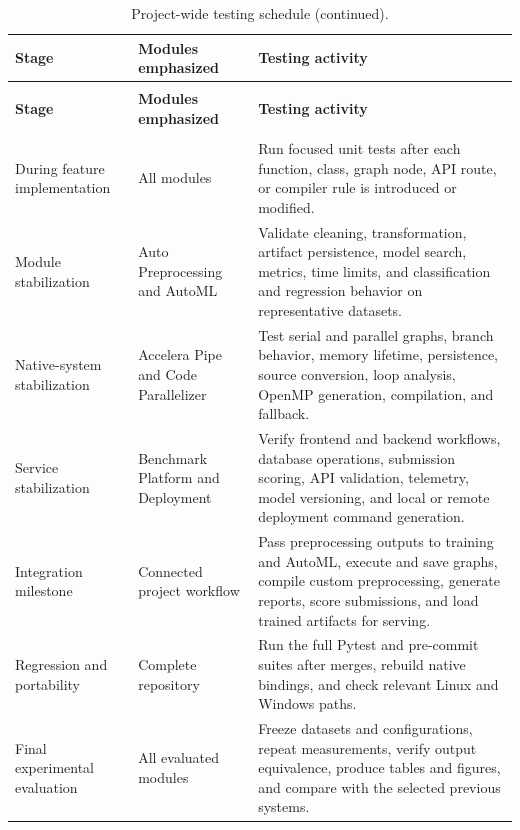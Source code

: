 \documentclass[12pt,a4paper]{report}
\newcommand{\acceleraTableStyle}{%
\small
\renewcommand{\arraystretch}{1.15}
\setlength{\tabcolsep}{4pt}%
}
\begin{document}
\acceleraTableStyle
\begin{longtable}{>{\raggedright\arraybackslash}p{}
  >{\raggedright\arraybackslash}p{}
  >{\raggedright\arraybackslash}p{}}
\caption{Project-wide testing schedule.}
\label{tab:project-testing-schedule}\\
\toprule
\textbf{Stage} & \textbf{Modules emphasized} & \textbf{Testing activity} \\
\midrule
\endfirsthead
\caption[]{Project-wide testing schedule (continued).}\\
\toprule
\textbf{Stage} & \textbf{Modules emphasized} & \textbf{Testing activity} \\
\midrule
\endhead
\midrule
\multicolumn{3}{r}{\small Continued on the next page}\\
\endfoot
\bottomrule
\endlastfoot
During feature implementation & All modules & Run focused unit tests after each
function, class, graph node, API route, or compiler rule is introduced or
modified. \\
\midrule
Module stabilization & Auto Preprocessing and AutoML & Validate cleaning,
transformation, artifact persistence, model search, metrics, time limits, and
classification and regression behavior on representative datasets. \\
\midrule
Native-system stabilization & Accelera Pipe and Code Parallelizer & Test serial
and parallel graphs, branch behavior, memory lifetime, persistence, source
conversion, loop analysis, OpenMP generation, compilation, and fallback. \\
\midrule
Service stabilization & Benchmark Platform and Deployment & Verify frontend and
backend workflows, database operations, submission scoring, API validation,
telemetry, model versioning, and local or remote deployment command generation. \\
\midrule
Integration milestone & Connected project workflow & Pass preprocessing outputs
to training and AutoML, execute and save graphs, compile custom preprocessing,
generate reports, score submissions, and load trained artifacts for serving. \\
\midrule
Regression and portability & Complete repository & Run the full Pytest and
pre-commit suites after merges, rebuild native bindings, and check relevant
Linux and Windows paths. \\
\midrule
Final experimental evaluation & All evaluated modules & Freeze datasets and
configurations, repeat measurements, verify output equivalence, produce tables
and figures, and compare with the selected previous systems. \\
\end{longtable}
\end{document}
